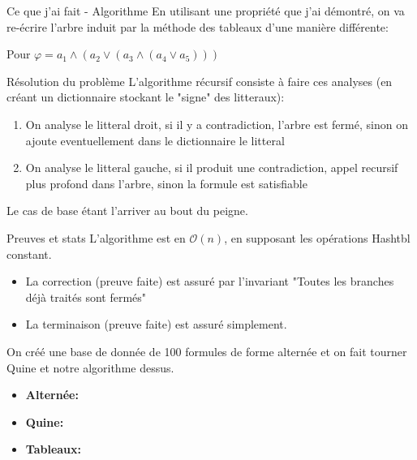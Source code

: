 \documentclass[]{beamer}
\begin{document}
\begin{frame}{Ce que j'ai fait - Algorithme}
    En utilisant une propriété que j'ai démontré, on va re-écrire l'arbre induit par la méthode des tableaux d'une manière différente:
   
    Pour $\varphi = a_1\land(a_2\lor(a_3\land(a_4\lor a_5)))$
\end{frame}

\begin{frame}{Résolution du problème}
    L'algorithme récursif consiste à faire ces analyses (en créant un dictionnaire stockant le "signe" des litteraux):
    \begin{enumerate}
        \item On analyse le litteral droit, si il y a contradiction, l'arbre est fermé, sinon on ajoute eventuellement dans le dictionnaire le litteral
        \item On analyse le litteral gauche, si il produit une contradiction, appel recursif plus profond dans l'arbre, sinon la formule est satisfiable
    \end{enumerate}
    Le cas de base étant l'arriver au bout du peigne.
\end{frame}

\begin{frame}{Preuves et stats}
    L'algorithme est en $\mathcal{O}(n)$, en supposant les opérations Hashtbl constant.
    \pause
    \begin{itemize}
        \item La correction (preuve faite) est assuré par l'invariant "Toutes les branches déjà traités sont fermés"
        \item La terminaison (preuve faite) est assuré simplement.
    \end{itemize}
    \pause
    On créé une base de donnée de 100 formules de forme alternée et on fait tourner Quine et notre algorithme dessus.
    \begin{itemize}
        \item \textbf{Alternée:}  %
        \item \textbf{Quine:} 
        \item \textbf{Tableaux:} 
    \end{itemize}  
\end{frame}
 
\end{document}
